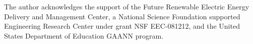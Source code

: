 The author acknowledges the support of the Future Renewable Electric Energy Delivery and Management Center, a National Science Foundation supported Engineering Research Center under grant NSF EEC-081212, and the United States Department of Education GAANN program.
